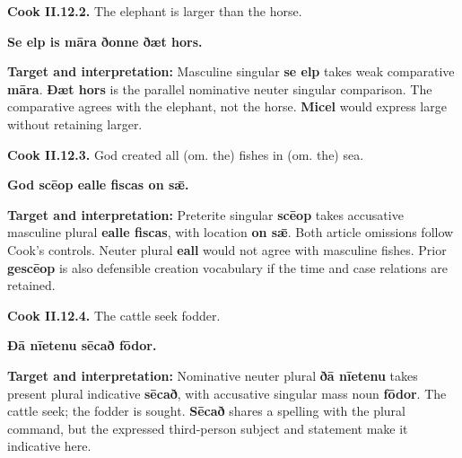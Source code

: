 \par\begin{minipage}{\linewidth}\raggedright
\textbf{Cook II.12.2.} The elephant is larger than the horse.

\textbf{Se elp is māra ðonne ðæt hors.}

\textbf{Target and interpretation:} Masculine singular \textbf{se elp} takes weak comparative \textbf{māra}. \textbf{Ðæt hors} is the parallel nominative neuter singular comparison. The comparative agrees with the elephant, not the horse. \textbf{Micel} would express large without retaining larger.

\end{minipage}\par\addvspace{4pt}

\par\begin{minipage}{\linewidth}\raggedright
\textbf{Cook II.12.3.} God created all (om. the) fishes in (om. the) sea.

\textbf{God scēop ealle fiscas on sǣ.}

\textbf{Target and interpretation:} Preterite singular \textbf{scēop} takes accusative masculine plural \textbf{ealle fiscas}, with location \textbf{on sǣ}. Both article omissions follow Cook's controls. Neuter plural \textbf{eall} would not agree with masculine fishes. Prior \textbf{gescēop} is also defensible creation vocabulary if the time and case relations are retained.

\end{minipage}\par\addvspace{4pt}

\par\begin{minipage}{\linewidth}\raggedright
\textbf{Cook II.12.4.} The cattle seek fodder.

\textbf{Ðā nīetenu sēcað fōdor.}

\textbf{Target and interpretation:} Nominative neuter plural \textbf{ðā nīetenu} takes present plural indicative \textbf{sēcað}, with accusative singular mass noun \textbf{fōdor}. The cattle seek; the fodder is sought. \textbf{Sēcað} shares a spelling with the plural command, but the expressed third-person subject and statement make it indicative here.

\end{minipage}\par\addvspace{4pt}

